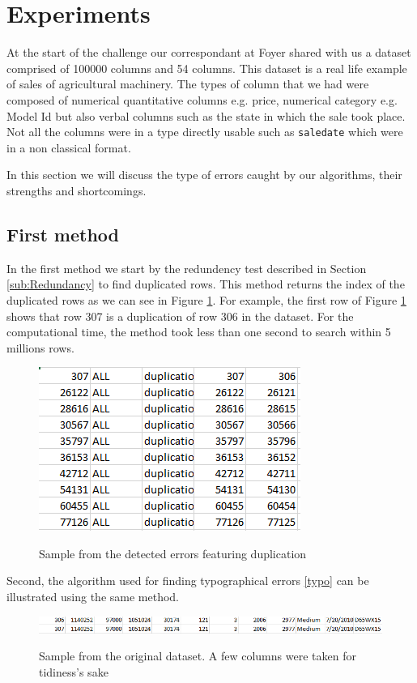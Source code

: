 \documentclass{article}
\begin{document}
\section{Experiments} %
\label{sec:Experiments}
At the start of the challenge our correspondant at Foyer shared with us a dataset comprised of 100000 columns and 54 columns.
This dataset is a real life example of sales of agricultural machinery.
The types of column that we had were composed of numerical quantitative columns e.g. price, numerical category  e.g. Model Id but also verbal columns such as the state in which the sale took place.
Not all the columns were in a type directly usable such as \texttt{saledate} which were in a non classical format.

In this section we will discuss the type of errors caught by our algorithms, their strengths and shortcomings.

\subsection{First method}
In the first method we start by the redundency test described in Section \ref{sub:Redundancy} to find duplicated rows.
This method returns the index of the duplicated rows as we can see in Figure \ref{fig:exp_duplicate}.
For example, the first row of Figure \ref{fig:exp_duplicate}
shows that row 307 is a duplication of row 306 in the dataset.
For the computational time, the method took less than one second to search within 5 millions rows.
\begin{figure}[H]
    \centering
    \includegraphics[scale=0.5]{picture/exp_duplicated.png}
    \label{fig:exp_duplicate}
    \caption{Sample from the detected errors featuring duplication}
\end{figure}

Second, the algorithm used for finding typographical errors \ref{typo} can be illustrated using the same method.
\begin{figure}[h]
    \centering
    \includegraphics[width=\linewidth]{picture/exp_duplicated_db.png}
    \label{fig:exp_duplicate_db}
    \caption{Sample from the original dataset.  A few columns were taken for tidiness's sake}
\end{figure}
\end{document}
